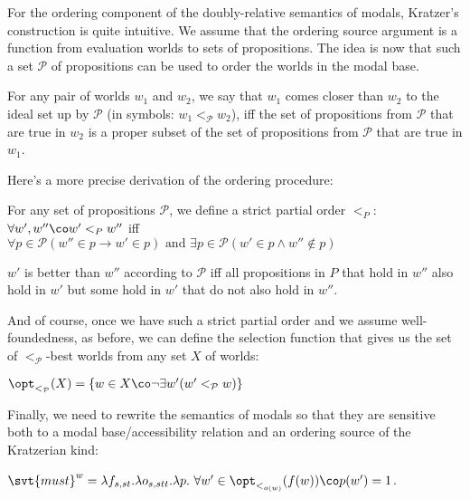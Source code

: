 %
For the ordering component of the doubly-relative semantics of modals, Kratzer's
construction is quite intuitive. We assume that the ordering source argument is
a function from evaluation worlds to sets of propositions. The idea is now that
such a set $\mathcal{P}$ of propositions can be used to order the worlds in the
modal base.

For any pair of worlds $w_1$ and $w_2$, we say that $w_1$ comes closer than
$w_2$ to the ideal set up by $\mathcal{P}$ (in symbols:
$w_1 <_{\mathcal{P}} w_2$), iff the set of propositions from $\mathcal{P}$ that
are true in $w_2$ is a proper subset of the set of propositions from
$\mathcal{P}$ that are true in $w_1$.

Here's a more precise derivation of the ordering procedure:

\ex For any set of propositions $\mathcal{P}$, we define a strict partial order
$<_P$:\\
    \(\forall w', w''\co w' <_P w''\) iff \\
    \hfill \(\forall p \in \mathcal{P} \left( w'' \in p \rightarrow w' \in p \right)
    \mbox{ and } \exists p \in \mathcal{P} \left( w' \in p \wedge w'' \not\in p
    \right)\)

$w'$ is better than $w''$ according to $\mathcal{P}$ iff all propositions in $P$
that hold in $w''$ also hold in $w'$ but some hold in $w'$ that do not also hold
in $w''$.
\xe

And of course, once we have such a strict partial order and we assume
well-foundedness, as before, we can define the selection function that gives us
the set of $<_{\mathcal{P}}$-best worlds from any set $X$ of worlds:

\ex
$\opt_{<_{\mathcal{P}}}(X) = \{w\in X\co \neg\exists w'(w'<_{\mathcal{P}} w)\}$
\xe

Finally, we need to rewrite the semantics of modals so that they are sensitive
both to a modal base/accessibility relation and an ordering source of the
Kratzerian kind:

\ex\label{ex:modal-2}
$\svt{must}^w = \lambda f_{s,st}.\lambda o_{s,stt}.\lambda p.\ \forall
w'\in\opt_{<_{o(w)}}(f(w))\co p(w')=1$.
\xe

